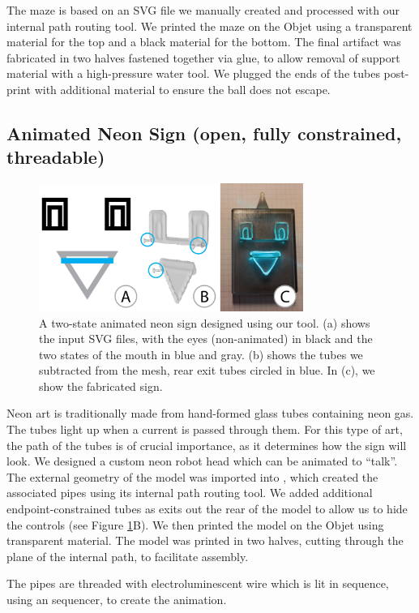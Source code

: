 The maze is based on an SVG file we manually created and processed with our internal path routing tool.  We printed the maze on the Objet using a transparent material for the top and a black material for the bottom. The final artifact was fabricated in two halves fastened together via glue, to allow removal of support material with a high-pressure water tool.  We plugged the ends of the tubes post-print with additional material to ensure the ball does not escape.

\subsection{Animated Neon Sign (open, fully constrained, threadable)}

\begin{figure}[t]
\centering
    \includegraphics[width=3.4in]{figures/sign.png}
\caption{A two-state animated neon sign designed using our tool.  (a) shows the input SVG files, with the eyes (non-animated) in black and the two states of the mouth in {\color{blue}blue} and {\color{gray}gray}.  (b) shows the tubes we subtracted from the mesh, rear exit tubes circled in {\color{blue}blue}. In (c), we show the fabricated sign.}
\label{fig:neon}
\end{figure}

Neon art is traditionally made from hand-formed glass tubes containing neon gas.  The tubes light up when a current is passed through them.  For this type of art, the path of the tubes is of crucial importance, as it determines how the sign will look.  We designed a custom neon robot head which can be animated to ``talk''. 
The external geometry of the model was imported into \systemnamenospace, which created the associated pipes using its internal path routing tool.  We added additional endpoint-constrained tubes as exits out the rear of the model to allow us to hide the controls (see Figure \ref{fig:neon}B).  We then printed the model on the Objet using transparent material. The model was printed in two halves, cutting through the plane of the internal path, to facilitate assembly. 

The pipes are threaded with electroluminescent wire which is lit in sequence, using an sequencer, to create the animation.
